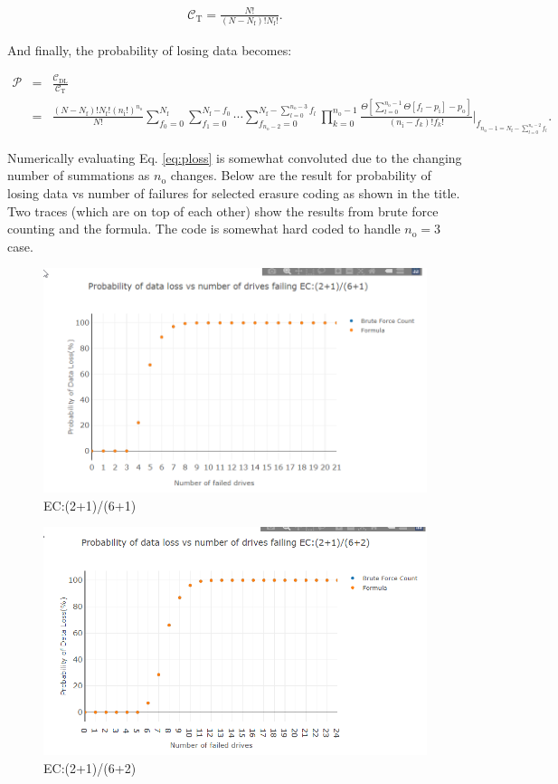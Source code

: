 \documentclass[journal]{IEEEtran}
\begin{document}
\begin{eqnarray}
\mathcal{C}_\text{T}=\frac{N!}{(N-N_\text{f})!N_\text{f}!}.
\label{eq:pb0}
\end{eqnarray}

And finally, the probability of losing data becomes:

\begin{eqnarray}
\mathcal{P}&=&\frac{\mathcal{C}_\text{DL}}{\mathcal{C}_\text{T}}\nonumber\\
&=& \frac{(N-N_\text{f})!N_\text{f}! \left(n_\text{i}!\right)^{n_\text{o}}}{ N!}  \sum_{f_0=0}^{N_\text{f}}\sum_{f_1=0}^{N_\text{f}-f_0}\cdots \sum_{f_{n_\text{o}-2}=0}^{N_\text{f}-\sum_{l=0}^{n_\text{o}-3}f_l} {\displaystyle \prod_{k=0}^{n_\text{o}-1}} \frac{\Theta\left[  \sum_{l=0}^{n_\text{o}-1}  \Theta \left[f_l-p_\text{i} \right]-p_\text{o}     \right]}{(n_\text{i}-f_k)!f_k!}\bigg\rvert_{f_{ n_\text{o}-1=N_\text{f}-\sum_{l=0}^{n_\text{o}-2}f_l}}.
\label{eq:ploss}
\end{eqnarray}

Numerically evaluating Eq. \eqref{eq:ploss} is somewhat convoluted due to the changing number of summations as \(n_\text{o}\) changes. Below are the result for probability of losing data vs number of failures for selected erasure coding as shown in the title. Two traces (which are on top of each other) show the results from brute force counting and the formula. The code is somewhat hard coded to handle \(n_\text{o}=3\) case.

\begin{figure}[H]

{\centering \includegraphics[width=0.65\linewidth]{2161} 

}

\caption{EC:(2+1)/(6+1)}\label{fig:2161}
\end{figure}

\begin{figure}[H]

{\centering \includegraphics[width=0.65\linewidth]{2162} 

}

\caption{EC:(2+1)/(6+2)}\label{fig:2162}
\end{figure}
\end{document}
